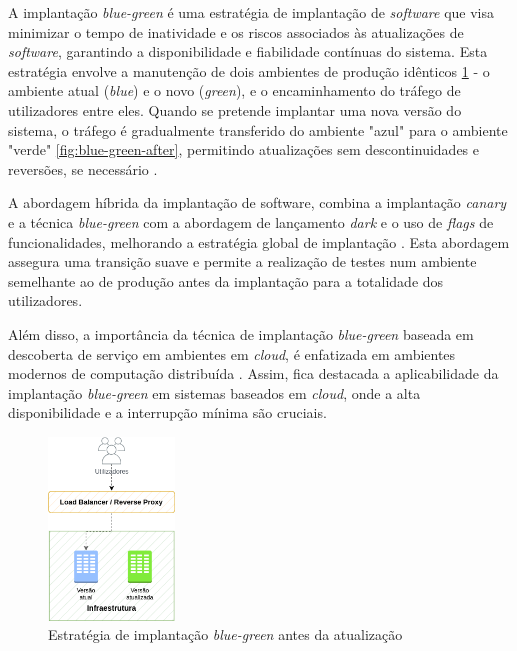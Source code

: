A implantação \textit{blue-green} é uma estratégia de implantação de \textit{software} que visa 
minimizar o tempo de inatividade e os riscos associados às atualizações de \textit{software}, 
garantindo a disponibilidade e fiabilidade contínuas do sistema. Esta estratégia envolve a
manutenção de dois ambientes de produção idênticos \ref{fig:blue-green-before} - o ambiente atual 
(\textit{blue}) e o novo (\textit{green}), e o encaminhamento do tráfego de utilizadores entre eles. 
Quando se pretende implantar uma nova versão do sistema, o tráfego é gradualmente transferido do 
ambiente "azul" para o ambiente "verde" \ref{fig:blue-green-after}, permitindo atualizações sem descontinuidades e reversões, se necessário 
\cite{canary2022}.

A abordagem híbrida da implantação de software, combina a implantação \textit{canary} e a técnica 
\textit{blue-green} com a abordagem de lançamento \textit{dark} e o uso de \textit{flags} de 
funcionalidades, melhorando a estratégia global de implantação \cite{canary2022}. Esta abordagem 
assegura uma transição suave e permite a realização de testes num ambiente semelhante ao de 
produção antes da implantação para a totalidade dos utilizadores.

Além disso, a importância da técnica de implantação \textit{blue-green} baseada em descoberta de 
serviço em ambientes em \textit{cloud}, é enfatizada em ambientes modernos de computação distribuída
\cite{bluegreen}. Assim, fica destacada a aplicabilidade da implantação \textit{blue-green} em sistemas 
baseados em \textit{cloud}, onde a alta disponibilidade e a interrupção mínima são cruciais.

\begin{figure}[H]
    \centering
    \includegraphics[width=0.3\textwidth]{media/content/estado-arte/blue-green-before.png}
    \caption{Estratégia de implantação \textit{blue-green} antes da atualização}
    \label{fig:blue-green-before}
\end{figure}

